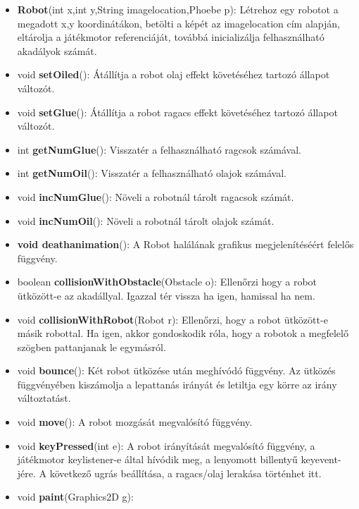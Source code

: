 \begin{itemize}
	\begin{itemize}
		\item \textbf{Robot}(int x,int y,String imagelocation,Phoebe p): Létrehoz egy robotot a megadott x,y koordinátákon, betölti a képét az imagelocation cím alapján, eltárolja a játékmotor referenciáját, továbbá inicializálja felhasználható akadályok számát.
		\item void \textbf{setOiled}(): Átállítja a robot olaj effekt követéséhez tartozó állapot változót.
		\item void \textbf{setGlue}(): Átállítja a robot ragacs effekt követéséhez tartozó állapot változót.
		\item int \textbf{getNumGlue}(): Visszatér a felhasználható ragcsok számával.
		\item int \textbf{getNumOil}(): Visszatér a felhasználható olajok számával.
		\item void \textbf{incNumGlue}(): Növeli a robotnál tárolt ragacsok számát.
		\item void \textbf{incNumOil}(): Növeli a robotnál tárolt olajok számát.
		\item \textbf{void deathanimation}(): A Robot halálának grafikus megjelenítéséért felelős függvény.
		\item boolean \textbf{collisionWithObstacle}(Obstacle o): Ellenőrzi hogy a robot ütközött-e az akadállyal. Igazzal tér vissza ha igen, hamissal ha nem.
		\item void \textbf{collisionWithRobot}(Robot r): Ellenőrzi, hogy a robot ütközött-e másik robottal. Ha igen, akkor gondoskodik róla, hogy a robotok a megfelelő szögben pattanjanak le egymásról.
		\item void \textbf{bounce}(): Két robot ütközése után meghívódó függvény. Az ütközés függvényében kiszámolja a lepattanás irányát és letiltja egy körre az irány változtatást.
		\item void \textbf{move}(): A robot mozgását megvalósító függvény.
		\item void \textbf{keyPressed}(int e): A robot irányítását megvalósító függvény, a játékmotor keylistener-e által hívódik meg, a lenyomott billentyű keyevent-jére. A következő ugrás beállítása, a ragacs/olaj lerakása történhet itt.
		\item void \textbf{paint}(Graphics2D g): 
	\end{itemize}
\end{itemize}

